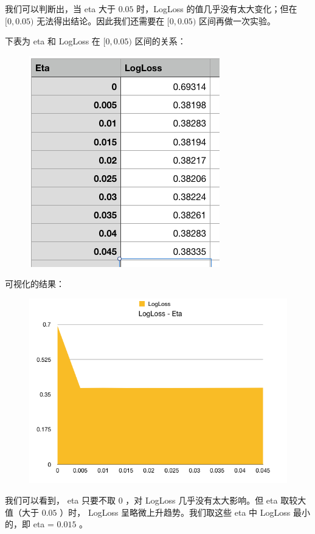 \documentclass{article}
\begin{document}
我们可以判断出，当 eta 大于 $0.05$ 时，LogLoss 的值几乎没有太大变化；但在 $[0, 0.05)$ 无法得出结论。因此我们还需要在 $[0, 0.05)$ 区间再做一次实验。

下表为 eta 和 LogLoss 在 $[0, 0.05)$ 区间的关系：

\begin{figure}[!h]
\centering
\includegraphics[scale=0.45]{tu4.png}
\end{figure}

\newpage

可视化的结果：

\begin{figure}[!h]
\centering
\includegraphics[scale=0.5]{tu3.png}
\end{figure}

我们可以看到， eta 只要不取 $0$ ，对 LogLoss 几乎没有太大影响。但 eta 取较大值（大于 $0.05$ ）时， LogLoss 呈略微上升趋势。我们取这些 eta 中 LogLoss 最小的，即 eta = $0.015$ 。
\end{document}
